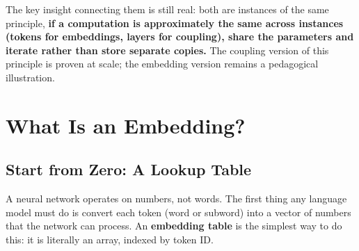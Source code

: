 \documentclass[11pt, a4paper]{article}
\theoremstyle{remark}
\begin{document}
The key insight connecting them is still real: both are instances of the same principle, \textbf{if a computation is approximately the same across instances (tokens for embeddings, layers for coupling), share the parameters and iterate rather than store separate copies.}
The coupling version of this principle is proven at scale; the embedding version remains a pedagogical illustration.


\section{What Is an Embedding?}
\label{sec:embedding}

\subsection{Start from Zero: A Lookup Table}

A neural network operates on numbers, not words.
The first thing any language model must do is convert each token (word or subword) into a vector of numbers that the network can process.
An \textbf{embedding table} is the simplest way to do this: it is literally an array, indexed by token ID.
\end{document}
